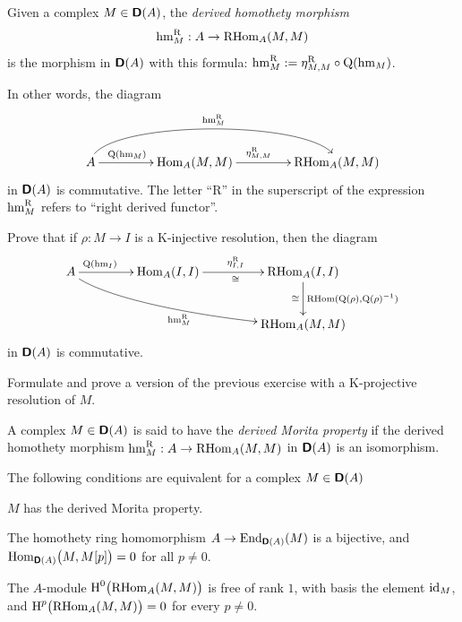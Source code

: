 \begin{dfn} \label{dfn:2392}
Given a complex $M \in \boldsymbol{\mathsf{D}}(A)$, the 
{\em derived homothety morphism}%
\[ \operatorname{hm}^{\mathrm{R}}_{M} : A \to \operatorname{RHom}_A(M, M) \]
is the morphism in $\boldsymbol{\mathsf{D}}(A)$ with this formula:
$\operatorname{hm}^{\mathrm{R}}_{M} := \eta^{\mathrm{R}}_{M,M} \circ \operatorname{Q}(\operatorname{hm}_{M})$.
\end{dfn}

In other words, the diagram 
\[ \UseTips \xymatrix @C=10ex @R=8ex {
A
\ar[r]^(0.35){\opn{Q}(\opn{hm}_{M})}
\ar@(u,u)[rr]^{\opn{hm}^{\mrm{R}}_{M}}
&
\opn{Hom}_A(M, M) 
\ar[r]^(0.45){\eta^{\mrm{R}}_{M,M}}
&
\opn{RHom}_A(M, M) 
} \]
in $\boldsymbol{\mathsf{D}}(A)$ is commutative.
The letter ``R'' in the superscript of the expression 
$\operatorname{hm}^{\mathrm{R}}_{M}$ refers to ``right derived functor''. 

\begin{exer} \label{exer:2393}
Prove that if $\rho : M \to I$ is a K-injective resolution, then 
the diagram 
\[ \UseTips \xymatrix @C=10ex @R=6ex {
A
\ar[r]^(0.3){\opn{Q}(\opn{hm}_{I})}
\ar@(dr,l)[drr]_{\opn{hm}^{\mrm{R}}_{M}}
&
\opn{Hom}_A(I, I)
\ar[r]^{\eta^{\mrm{R}}_{I, I}}_{\cong}
&
\opn{RHom}_A(I, I)
\ar[d]^{\opn{RHom}(\opn{Q}(\rho), \opn{Q}(\rho)^{-1})}_{\cong}
\\
&
&
\opn{RHom}_A(M, M)
} \]
in $\boldsymbol{\mathsf{D}}(A)$ is commutative.
\end{exer}

\begin{exer} \label{exer:2165}
Formulate and prove a version of the previous exercise with a K-projective 
resolution of $M$. 
\end{exer}

\begin{dfn} \label{dfn:2394}
A complex $M \in \boldsymbol{\mathsf{D}}(A)$ is said to have the {\em derived Morita property}
if the derived homothety morphism 
$\operatorname{hm}^{\mathrm{R}}_{M} : A \to \operatorname{RHom}_A(M, M)$ 
in $\boldsymbol{\mathsf{D}}(A)$ is an isomorphism. 
\end{dfn}

\begin{prop} \label{prop:2335}
The following conditions are equivalent for a complex 
$M \in \boldsymbol{\mathsf{D}}(A)$~\tup{:}
\begin{itemize}
 $M$ has the  derived Morita property.

 The homothety ring homomorphism 
$A \to \operatorname{End}_{\boldsymbol{\mathsf{D}}(A)}(M)$
is a bijective, and 
$\operatorname{Hom}_{\boldsymbol{\mathsf{D}}(A)} \bigl( M, M[p] \bigr) = 0$ 
for all $p \neq 0$. 

 The $A$-module 
$\operatorname{H}^0 \bigl( \operatorname{RHom}_{A}(M, M) \bigr)$ 
is free of rank $1$, with basis the element $\operatorname{id}_M$, and 
$\operatorname{H}^p \bigl( \operatorname{RHom}_{A}(M, M) \bigr) = 0$ 
for every $p \neq 0$.  
\end{itemize}
\end{prop}

